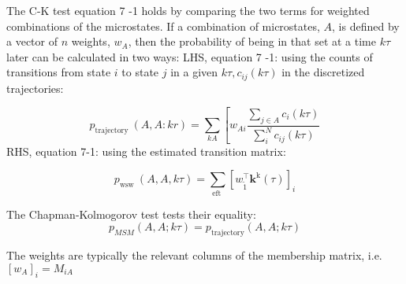 The C-K test equation 7 -1 holds by comparing the two terms for weighted combinations of the microstates. If a combination of microstates, $A$, is defined by a vector of $n$ weights, $w_{A}$, then the probability of being in that set at a time $k \tau$ later can be calculated in two ways:
LHS, equation 7 -1: using the counts of transitions from state $i$ to state $j$ in a given $k \tau, c_{i j}(k \tau)$ in the discretized trajectories:

\begin{equation}
p_{\text {trajectory }}(A, A: k r)=\sum_{k A}\left[w_{A i} \frac{\sum_{j \in A} c_{i}(k \tau)}{\sum_{i}^{N} c_{i j}(k \tau)}\right.
\end{equation}
RHS, equation 7-1: using the estimated transition matrix:

\begin{equation}
p_{\text {wsw }}(A, A, k \tau)=\sum_{\text {eft }}\left[w_{\tilde{1}}^{\top} \mathbf{k}^{\mathrm{k}}(\tau)\right]_{i}
\end{equation}

The Chapman-Kolmogorov test tests their equality:
\begin{equation}\label{eqn:ck_test}
p_{M S M}(A, A ; k \tau)=p_{\text {trajectory}}(A, A ; k \tau)
\end{equation}

The weights are typically the relevant columns of the membership matrix, i.e. $\left[w_{A}\right]_{i}=M_{i A}$
